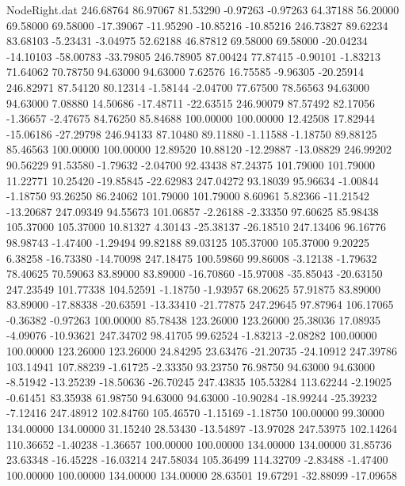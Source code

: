 \begin{filecontents}{NodeRight.dat}
 246.68764   86.97067   81.53290    -0.97263   -0.97263   64.37188   56.20000   69.58000   69.58000  -17.39067  -11.95290  -10.85216  -10.85216
 246.73827   89.62234   83.68103    -5.23431   -3.04975   52.62188   46.87812   69.58000   69.58000  -20.04234  -14.10103  -58.00783  -33.79805
 246.78905   87.00424   77.87415    -0.90101   -1.83213   71.64062   70.78750   94.63000   94.63000    7.62576   16.75585   -9.96305  -20.25914
 246.82971   87.54120   80.12314    -1.58144   -2.04700   77.67500   78.56563   94.63000   94.63000    7.08880   14.50686  -17.48711  -22.63515
 246.90079   87.57492   82.17056    -1.36657   -2.47675   84.76250   85.84688  100.00000  100.00000   12.42508   17.82944  -15.06186  -27.29798
 246.94133   87.10480   89.11880    -1.11588   -1.18750   89.88125   85.46563  100.00000  100.00000   12.89520   10.88120  -12.29887  -13.08829
 246.99202   90.56229   91.53580    -1.79632   -2.04700   92.43438   87.24375  101.79000  101.79000   11.22771   10.25420  -19.85845  -22.62983
 247.04272   93.18039   95.96634    -1.00844   -1.18750   93.26250   86.24062  101.79000  101.79000    8.60961    5.82366  -11.21542  -13.20687
 247.09349   94.55673  101.06857    -2.26188   -2.33350   97.60625   85.98438  105.37000  105.37000   10.81327    4.30143  -25.38137  -26.18510
 247.13406   96.16776   98.98743    -1.47400   -1.29494   99.82188   89.03125  105.37000  105.37000    9.20225    6.38258  -16.73380  -14.70098
 247.18475  100.59860   99.86008    -3.12138   -1.79632   78.40625   70.59063   83.89000   83.89000  -16.70860  -15.97008  -35.85043  -20.63150
 247.23549  101.77338  104.52591    -1.18750   -1.93957   68.20625   57.91875   83.89000   83.89000  -17.88338  -20.63591  -13.33410  -21.77875
 247.29645   97.87964  106.17065    -0.36382   -0.97263  100.00000   85.78438  123.26000  123.26000   25.38036   17.08935   -4.09076  -10.93621
 247.34702   98.41705   99.62524    -1.83213   -2.08282  100.00000  100.00000  123.26000  123.26000   24.84295   23.63476  -21.20735  -24.10912
 247.39786  103.14941  107.88239    -1.61725   -2.33350   93.23750   76.98750   94.63000   94.63000   -8.51942  -13.25239  -18.50636  -26.70245
 247.43835  105.53284  113.62244    -2.19025   -0.61451   83.35938   61.98750   94.63000   94.63000  -10.90284  -18.99244  -25.39232   -7.12416
 247.48912  102.84760  105.46570    -1.15169   -1.18750  100.00000   99.30000  134.00000  134.00000   31.15240   28.53430  -13.54897  -13.97028
 247.53975  102.14264  110.36652    -1.40238   -1.36657  100.00000  100.00000  134.00000  134.00000   31.85736   23.63348  -16.45228  -16.03214
 247.58034  105.36499  114.32709    -2.83488   -1.47400  100.00000  100.00000  134.00000  134.00000   28.63501   19.67291  -32.88099  -17.09658

\end{filecontents}
